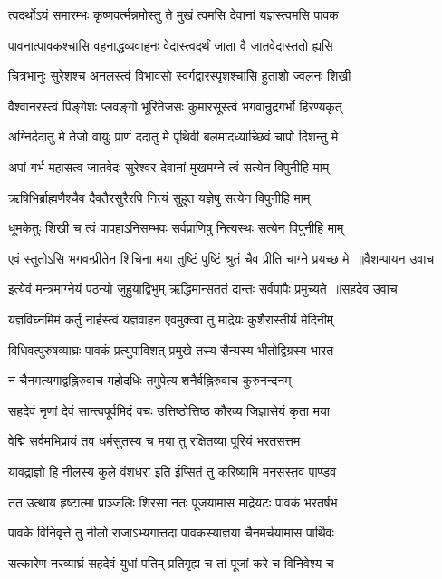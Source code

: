 \twolineshloka
{त्वदर्थोऽयं समारम्भः कृष्णवर्त्मन्नमोस्तु ते}
{मुखं त्वमसि देवानां यज्ञस्त्वमसि पावक}


\twolineshloka
{पावनात्पावकश्चासि वहनाद्धव्यवाहनः}
{वेदास्त्वदर्थं जाता वै जातवेदास्ततो ह्यसि}


\twolineshloka
{चित्रभानुः सुरेशश्च अनलस्त्वं विभावसो}
{स्वर्गद्वारस्पृशश्चासि हुताशो ज्वलनः शिखी}


\twolineshloka
{वैश्वानरस्त्वं पिङ्गेशः प्लवङ्गो भूरितेजसः}
{कुमारसूस्त्वं भगवान्रुद्रगर्भो हिरण्यकृत्}


\twolineshloka
{अग्निर्ददातु मे तेजो वायुः प्राणं ददातु मे}
{पृथिवी बलमादध्याच्छिवं चापो दिशन्तु मे}


\twolineshloka
{अपां गर्भ महासत्व जातवेदः सुरेश्वर}
{देवानां मुखमग्ने त्वं सत्येन विपुनीहि माम्}


\twolineshloka
{ऋषिभिर्ब्राह्मणैश्चैव दैवतैरसुरैरपि}
{नित्यं सुहुत यज्ञेषु सत्येन विपुनीहि माम्}


\twolineshloka
{धूमकेतुः शिखी च त्वं पापहाऽनिसम्भवः}
{सर्वप्राणिषु नित्यस्थः सत्येन विपुनीहि माम्}


\threelineshloka
{एवं स्तुतोऽसि भगवन्प्रीतेन शिचिना मया}
{तुष्टिं पुष्टिं श्रुतं चैव प्रीति चाग्ने प्रयच्छ मे ॥वैशम्पायन उवाच}
{}


\threelineshloka
{इत्येवं मन्त्रमाग्नेयं पठन्यो जुहुयाद्विभुम्}
{ऋद्धिमान्सततं दान्तः सर्वपापैः प्रमुच्यते ॥सहदेव उवाच}
{}


\twolineshloka
{यज्ञविघ्नमिमं कर्तुं नार्हस्त्वं यज्ञवाहन}
{एवमुक्त्वा तु माद्रेयः कुशैरास्तीर्य मेदिनीम्}


\twolineshloka
{विधिवत्पुरुषव्याघ्रः पावकं प्रत्युपाविशत्}
{प्रमुखे तस्य सैन्यस्य भीतोद्विग्रस्य भारत}


\twolineshloka
{न चैनमत्यगाद्वह्निरुवाच महोदधिः}
{तमुपेत्य शनैर्वह्निरुवाच कुरुनन्दनम्}


\twolineshloka
{सहदेवं नृणां देवं सान्त्वपूर्वमिदं वचः}
{उत्तिष्ठोत्तिष्ठ कौरव्य जिज्ञासेयं कृता मया}


\twolineshloka
{वेद्मि सर्वमभिप्रायं तव धर्मसुतस्य च}
{मया तु रक्षितव्या पूरियं भरतसत्तम}


\twolineshloka
{यावद्राज्ञो हि नीलस्य कुले वंशधरा इति}
{ईप्सितं तु करिष्यामि मनसस्तव पाण्डव}


\twolineshloka
{तत उत्थाय हृष्टात्मा प्राञ्जलिः शिरसा नतः}
{पूजयामास माद्रेयटः पावकं भरतर्षभ}


\twolineshloka
{पावके विनिवृत्ते तु नीलो राजाऽभ्यगात्तदा}
{पावकस्याज्ञया चैनमर्चयामास पार्थिवः}


\twolineshloka
{सत्कारेण नरव्याघ्रं सहदेवं युधां पतिम्}
{प्रतिगृह्य च तां पूजां करे च विनिवेश्य च}


